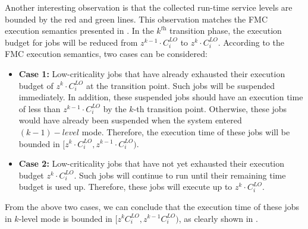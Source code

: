 \documentclass[10pt,journal,compsoc]{IEEEtran}
\begin{document}
Another interesting observation is that the collected run-time service levels are bounded by the red and green lines. This observation matches the FMC execution semantics presented in . In the $k^{\textit{th}}$ transition phase, the execution budget for \lo jobs will be reduced from $z^{k-1}\cdot{C_i^{LO}}$ to $z^{k}\cdot{C_i^{LO}}$. According to the FMC execution semantics, two cases can be considered:
\begin{itemize}
\item \textbf{Case 1:} Low-criticality jobs that have already exhausted their execution budget of $z^{k}\cdot{C_i^{LO}}$ at the transition point. Such jobs will be suspended immediately. In addition, these suspended jobs should have an execution time of less than $z^{k-1}\cdot{C_i^{LO}}$ by the $k$-th transition point. Otherwise, these jobs would have already been suspended when the system entered $(k-1)-level$ \hi mode. Therefore, the execution time of these jobs will be bounded in $[z^{k}\cdot{C_i^{LO}},z^{k-1}\cdot{C_i^{LO}})$. 
\item \textbf{Case 2:} Low-criticality jobs that have not yet exhausted their execution budget $z^{k}\cdot{C_i^{LO}}$. Such jobs will continue to run until their remaining time budget is used up. Therefore, these jobs will execute up to $z^{k}\cdot{C_i^{LO}}$.
\end{itemize}
From the above two cases, we can conclude that the execution time of these jobs in $k$-level \hi mode is bounded in $[z^{k}{C_i^{LO}},z^{k-1}{C_i^{LO}})$, as clearly shown in .
 

%
%
\end{document}
